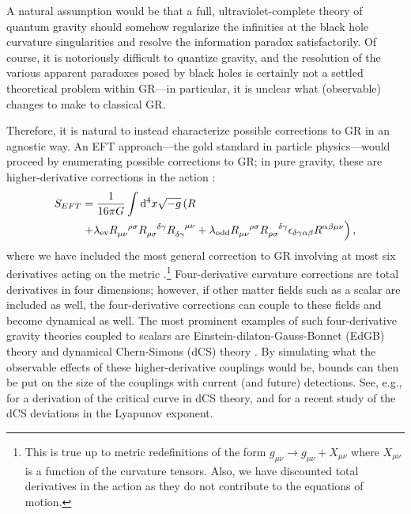 \documentclass[graybox,envcountchap]{svmult}
\newcommand{\ed}{\mathop{}\!\mathrm{d}}
\newcommand{\ind}[1]{\indices{#1}}
\begin{document}
A natural assumption would be that a full, ultraviolet-complete theory of quantum gravity should somehow regularize the infinities at the black hole curvature singularities and resolve the information paradox satisfactorily.
Of course, it is notoriously difficult to quantize gravity, and the resolution of the various apparent paradoxes posed by black holes is certainly not a settled theoretical problem within GR---in particular, it is unclear what (observable) changes to make to classical GR.

Therefore, it is natural to instead characterize possible corrections to GR in an agnostic way.
An EFT approach---the gold standard in particle physics---would proceed by enumerating possible corrections to GR; in pure gravity, these are higher-derivative corrections in the action \cite{Endlich2017}:
\begin{align}
    S_{EFT}&=\frac{1}{16\pi G}\int\ed^4x\sqrt{-g}\left(R\right.\notag\\
    \label{eq:Corrections}&\left.+\lambda_{\rm ev}R\ind{_{\mu\nu}^{\rho\sigma}}R\ind{_{\rho\sigma}^{\delta\gamma}}R\ind{_{\delta\gamma}^{\mu\nu}}+ \lambda_{\rm odd}R\ind{_{\mu\nu}^{\rho\sigma}}R\ind{_{\rho\sigma}^{\delta\gamma}} \epsilon_{\delta\gamma\alpha\beta}  R\ind{^{\alpha\beta}^{\mu\nu}}\right),
\end{align}
where we have included the most general correction to GR involving at most six derivatives acting on the metric \cite{Endlich2017,Cano2019}.\footnote{This is true up to metric redefinitions of the form $g_{\mu\nu}\rightarrow g_{\mu\nu}+X_{\mu\nu}$ where $X_{\mu\nu}$ is a function of the curvature tensors.
Also, we have discounted total derivatives in the action as they do not contribute to the equations of motion.}
Four-derivative curvature corrections are total derivatives in four dimensions; however, if other matter fields such as a scalar are included as well, the four-derivative corrections can couple to these fields and become dynamical as well.
The most prominent examples of such four-derivative gravity theories coupled to scalars are Einstein-dilaton-Gauss-Bonnet (EdGB) theory and dynamical Chern-Simons (dCS) theory \cite{Cano2019,Alexander2009}.
By simulating what the observable effects of these higher-derivative couplings would be, bounds can then be put on the size of the couplings with current (and future) detections.
See, e.g., \cite{Okounkova2019} for a derivation of the critical curve in dCS theory, and \cite{Deich2023} for a recent study of the dCS deviations in the Lyapunov exponent.
\end{document}
